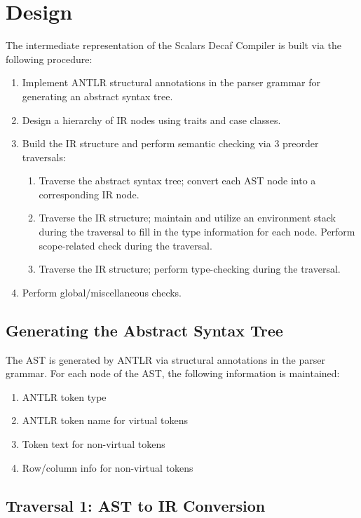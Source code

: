 \section{Design}

The intermediate representation of the Scalars Decaf Compiler is built via the following procedure:
\begin{enumerate}
    \item Implement ANTLR structural annotations in the parser grammar for generating an abstract syntax tree.
    \item Design a hierarchy of IR nodes using traits and case classes.
    \item Build the IR structure and perform semantic checking via 3 preorder traversals:
    \begin{enumerate}
        \item Traverse the abstract syntax tree; convert each AST node into a corresponding IR node.
        \item Traverse the IR structure; maintain and utilize an environment stack during the traversal to fill in the type information for each node. Perform scope-related check during the traversal.
        \item Traverse the IR structure; perform type-checking during the traversal.
    \end{enumerate}
    \item Perform global/miscellaneous checks.
\end{enumerate}

\subsection{Generating the Abstract Syntax Tree}

The AST is generated by ANTLR via structural annotations in the parser grammar. For each node of the AST, the following information is maintained:
\begin{enumerate}
    \item ANTLR token type
    \item ANTLR token name for virtual tokens
    \item Token text for non-virtual tokens
    \item Row/column info for non-virtual tokens
\end{enumerate}

\subsection{Traversal 1: AST to IR Conversion}

